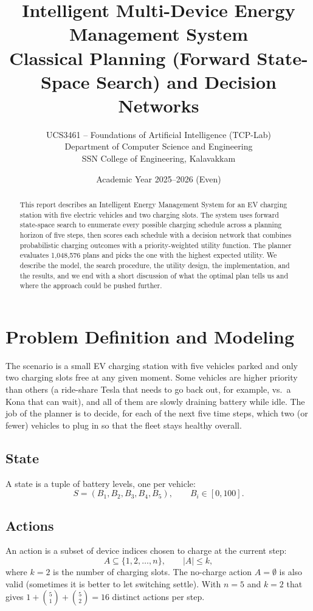 \documentclass[11pt,a4paper]{article}
\title{\textbf{Intelligent Multi-Device Energy Management System}\\[0.3em]
\large Classical Planning (Forward State-Space Search) and Decision Networks}
\author{UCS3461 -- Foundations of Artificial Intelligence (TCP-Lab)\\
Department of Computer Science and Engineering\\
SSN College of Engineering, Kalavakkam}
\date{Academic Year 2025--2026 (Even)}
\begin{document}
\maketitle

\begin{abstract}
\noindent This report describes an Intelligent Energy Management System for an EV
charging station with five electric vehicles and two charging slots. The system
uses forward state-space search to enumerate every possible charging schedule
across a planning horizon of five steps, then scores each schedule with a
decision network that combines probabilistic charging outcomes with a
priority-weighted utility function. The planner evaluates 1{,}048{,}576 plans and picks
the one with the highest expected utility. We describe the model, the search
procedure, the utility design, the implementation, and the results, and we end
with a short discussion of what the optimal plan tells us and where the approach
could be pushed further.
\end{abstract}

\section{Problem Definition and Modeling}

The scenario is a small EV charging station with five vehicles parked and only
two charging slots free at any given moment. Some vehicles are higher priority
than others (a ride-share Tesla that needs to go back out, for example, vs.\ a
Kona that can wait), and all of them are slowly draining battery while idle.
The job of the planner is to decide, for each of the next five time steps,
which two (or fewer) vehicles to plug in so that the fleet stays healthy
overall.

\subsection*{State}
A state is a tuple of battery levels, one per vehicle:
\[
    S = (B_1, B_2, B_3, B_4, B_5), \qquad B_i \in [0, 100].
\]

\subsection*{Actions}
An action is a subset of device indices chosen to charge at the current step:
\[
    A \subseteq \{1,2,\dots,n\}, \qquad |A| \le k,
\]
where $k = 2$ is the number of charging slots. The no-charge action $A=\emptyset$
is also valid (sometimes it is better to let switching settle). With $n=5$ and
$k=2$ that gives $1 + \binom{5}{1} + \binom{5}{2} = 16$ distinct actions per
step.
\end{document}
